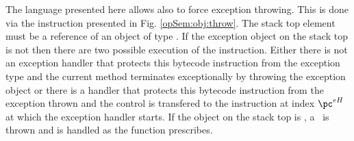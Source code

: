 \begin{figure}[ht!]
\end{figure}



The language presented here allows also to force  exception throwing. This is done via the
 instruction \athrow{} presented in Fig. \ref{opSem:obj:throw}.    The stack top element  must be a reference of an object of type  \Throwable. 
	 If the exception object \stackOnlyParam{\counterOnly} on the stack top is not \Mynull{} then there are two possible execution of the instruction.
	  Either there is not an exception handler  that protects this bytecode instruction from the 
	  exception type and the current method \methodd{} terminates exceptionally by throwing the exception object \stackOnlyParam{\counterOnly} or
	   there is a handler that protects this bytecode instruction from the exception thrown and the control is transfered
	  to the instruction at index $\pc^{eH}$  at which the exception handler starts. %
	  If the object on the stack top is \Mynull, a \NullPointerExc \ is thrown and is handled as the function \getStateAfterExc{} prescribes. 

